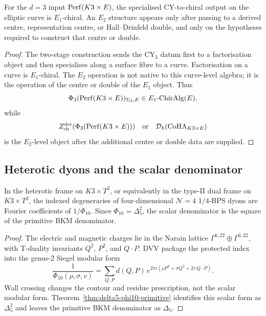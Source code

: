 \begin{proposition}[\texorpdfstring{$d=3$}{d=3} chiral output]
\label{prop:d3-e1-output-heterotic-note}
For the $d=3$ input $\mathrm{Perf}(K3\times E)$, the specialised
CY-to-chiral output on the elliptic curve is $E_1$-chiral. An $E_2$
structure appears only after passing to a derived centre, representation
centre, or Hall--Drinfeld double, and only on the hypotheses required to
construct that centre or double.
\end{proposition}

\begin{proof}
The two-stage construction sends the CY$_3$ datum first to a
factorisation object and then specialises along a surface fibre to a
curve. Factorisation on a curve is $E_1$-chiral. The $E_2$ operation is
not native to this curve-level algebra; it is the operation of the
centre or double of the $E_1$ object. Thus
\[
 \Phi_3(\mathrm{Perf}(K3\times E))_{\Sigma_2,E}
 \in E_1\text{-}\mathrm{ChirAlg}(E),
\]
while
\[
 Z_{\mathrm{ch}}^{\mathrm{der}}(\Phi_3(\mathrm{Perf}(K3\times E)))\quad
\text{or}\quad
\mathcal D_\hbar(\mathrm{CoHA}_{K3\times E})
\]
is the $E_2$-level object after the additional centre or double data are
supplied.
\end{proof}

\subsection*{Heterotic dyons and the scalar denominator}
\label{subsec:heterotic-dyons}

\begin{theorem}
\label{thm:dvv-scalar-denominator}
In the heterotic frame on $K3\times T^2$, or equivalently in the
type-II dual frame on $K3\times T^2$, the indexed degeneracies of
four-dimensional $\mathcal N=4$ $1/4$-BPS dyons are Fourier coefficients
of $1/\Phi_{10}$. Since $\Phi_{10}=\Delta_5^2$, the scalar denominator is
the square of the primitive BKM denominator.
\end{theorem}

\begin{proof}
The electric and magnetic charges lie in the Narain lattice
$\Gamma^{6,22}\oplus\Gamma^{6,22}$, with T-duality invariants
$Q^2$, $P^2$, and $Q\cdot P$. DVV package the protected index into the
genus-$2$ Siegel modular form
\[
 \frac{1}{\Phi_{10}(\rho,\sigma,v)}
 =\sum_{Q,P} d(Q,P)\,
 e^{2\pi i(\rho P^2+\sigma Q^2+2v\,Q\cdot P)} .
\]
Wall crossing changes the contour and residue prescription, not the
scalar modular form. Theorem~\ref{thm:delta5-phi10-primitive} identifies
this scalar form as $\Delta_5^2$ and leaves the primitive BKM denominator
as $\Delta_5$.
\end{proof}

